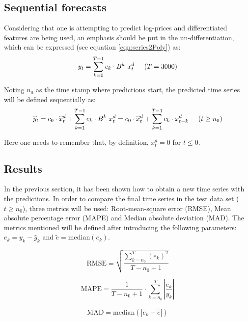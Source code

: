 \documentclass[a4paper]{report}
\begin{document}
\subsection{Sequential forecasts}
\label{sec:toyProjectSeqForecast}
Considering that one is attempting to predict log-prices and differentiated 
features are being used, an emphasis should be put in the un-differentiation, 
which can be expressed (see equation \ref{eqn:series2Poly}) as:
\begin{equation*}
y_t = \sum_{k = 0}^{T - 1} c_k \cdot B^k \ x_t^d \hspace{.5cm} (T = 3000)
\end{equation*}

Noting $n_0$ as the time stamp where predictions start, the predicted time 
series will be defined sequentially as:
\begin{equation*}
	\widehat{y}_t = c_0 \cdot \widehat{x}_t^d + \sum_{k = 1}^{T - 1} c_k 
	\cdot B^k \ 	x_t^d = c_0 \cdot \widehat{x}_t^d + \sum_{k = 1}^{T - 1} c_k 
	\cdot x_{t - k}^d \hspace{.5cm} (t \geq n_0)
\end{equation*}

Here one needs to remember that, by definition, $x_{t}^d = 0$ for $t \leq 
0$.

\subsection{Results}
In the previous section, it has been shown how to obtain a new time series 
with the predictions. In order to compare the final time series in the test 
data set ($t \geq n_0$), three metrics will be used: Root-mean-square error 
(RMSE), Mean absolute percentage error (MAPE) and Median absolute deviation 
(MAD). The metrics mentioned will be defined after introducing the following 
parameters: $e_k = y_k - \widehat{y}_k$ and $\widetilde{e} = 
\text{median}(e_k)$.

\begin{equation*}
	\text{RMSE} = \sqrt{\frac{\sum_{k = n_0}^{T} (e_k)^2}
	{T - n_0 + 1}} 
\end{equation*}

\begin{equation*}
	\text{MAPE} = \frac{1}{T - n_0 + 1} \cdot \sum_{k = n_0}^T 
	\left| \frac{e_k}{y_k} \right| 
\end{equation*}

\begin{align*}
	\text{MAD} = \text{median}(|e_k - \widetilde{e}|)	
\end{align*}
\end{document}
